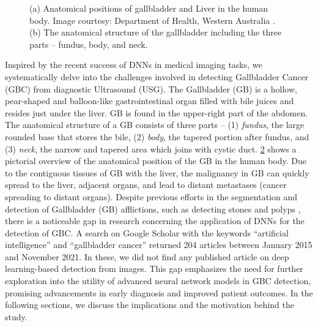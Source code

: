 \begin{figure}[!t]
\begin{subfigure}[b]{0.32\linewidth}
		\caption{}
		\label{fig:gb_anatomy}
	\end{subfigure}
	\caption[Anatomy of Gallbladder in the human body]{(a) Anatomical positions of gallbladder and Liver in the human body. Image courtesy: Department of Health, Western Australia \cite{gb_image}. (b) The anatomical structure of the gallbladder including the three parts -- fundus, body, and neck.}
    \label{fig:gb}
\end{figure}

\par Inspired by the recent success of DNNs in medical imaging tasks, we systematically delve into the challenges involved in detecting Gallbladder Cancer (GBC) from diagnostic Ultrasound (USG). The Gallbladder (GB) is a hollow, pear-shaped and balloon-like gastrointestinal organ filled with bile juices and resides just under the liver. GB is found in the upper-right part of the abdomen. The anatomical structure of a GB consists of three parts -- (1) \emph{fundus}, the large rounded base that stores the bile, (2) \emph{body}, the tapered portion after fundus, and (3) \emph{neck}, the narrow and tapered area which joins with cystic duct. \cref{fig:gb} shows a pictorial overview of the anatomical position of the GB in the human body. Due to the contiguous tissues of GB with the liver, the malignancy in GB can quickly spread to the liver, adjacent organs, and lead to distant metastases (cancer spreading to distant organs). %
Despite previous efforts in the segmentation and detection of Gallbladder (GB) afflictions, such as detecting stones and polyps \cite{gbPolyp, gbPolyp2, gbAutomatic}, there is a noticeable gap in research concerning the application of DNNs for the detection of GBC. A search on Google Scholar with the keywords ``artificial intelligence'' and ``gallbladder cancer'' returned 204 articles between January 2015 and November 2021. In these, we did not find any published article on deep learning-based \gbc detection from \usg images. This gap emphasizes the need for further exploration into the utility of advanced neural network models in GBC detection, promising advancements in early diagnosis and improved patient outcomes. In the following sections, we discuss the implications and the motivation behind the study. 


